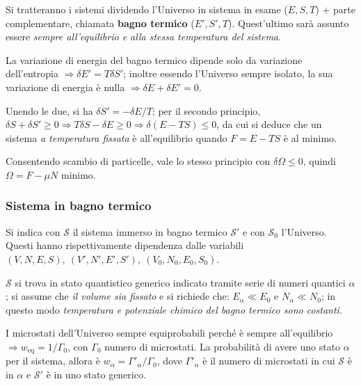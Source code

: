 \documentclass[10pt, a4paper]{scrartcl}
\numberwithin{equation}{subsection}
\theoremstyle{style1}
\begin{document}
Si tratteranno i sistemi dividendo l'Universo in sistema in esame ($E,S,T$) $+$ parte complementare, chiamata \textbf{bagno termico} ($E',S',T$). Quest'ultimo sar\`a assunto essere \textit{sempre all'equilibrio e alla stessa temperatura del sistema}. 

La variazione di energia del bagno termico dipende solo da variazione dell'entropia $\Rightarrow \delta E' = T \delta S'$; inoltre essendo l'Universo sempre isolato, la sua variazione di energia \`e nulla $\Rightarrow \delta E + \delta E' =0$. 

Unendo le due, si ha $\delta S' = -\delta E / T$; per il secondo principio, $\delta S + \delta S' \ge 0 \Rightarrow T\delta S - \delta E \ge 0 \Rightarrow \delta (E-TS) \le 0$, da cui si deduce che un sistema \textit{a temperatura fissata} \`e all'equilibrio quando $F = E- TS $ \`e al minimo.

Consentendo scambio di particelle, vale lo stesso principio con $\delta \Omega \le 0$, quindi $\Omega = F - \mu N $ minimo.
\subsubsection{Sistema in bagno termico}

Si indica con $\mathscr{S}$ il sistema immerso in bagno termico $\mathscr{S}'$ e con $\mathscr{S}_0$ l'Universo. Questi hanno rispettivamente dipendenza dalle variabili $(V,N,E,S), \ (V',N',E',S') , \ (V_0,N_0,E_0,S_0)$.

$\mathscr{S}$ si trova in stato quantistico generico indicato tramite serie di numeri quantici $\alpha $; si assume che \textit{il volume sia fissato} e si richiede che: $E_\alpha \ll E_0$ e $N_\alpha  \ll N_0$; in questo modo \textit{temperatura e potenziale chimico del bagno termico sono costanti}.

I microstati dell'Universo sempre equiprobabili perch\'e \`e sempre all'equilibrio $\Rightarrow w_\text{eq} = 1 / \Gamma_0$, con $\Gamma_0$ numero di microstati. La probabilit\`a di avere uno stato $\alpha $ per il sistema, allora \`e $w_\alpha  = \Gamma'_\alpha  / \Gamma_0$, dove $\Gamma'_\alpha $ \`e il numero di microstati in cui $\mathscr{S}$ \`e in $\alpha $ e $\mathscr{S}' $ \`e in uno stato generico.
\end{document}

